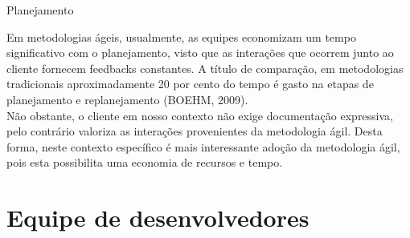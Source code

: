 \large{Planejamento\\}

\tab Em metodologias ágeis, usualmente, as equipes economizam um tempo significativo com o planejamento, visto que as interações que ocorrem junto ao cliente fornecem feedbacks constantes. A título de comparação, em metodologias tradicionais aproximadamente 20 por cento do tempo é gasto na etapas de planejamento e replanejamento (BOEHM, 2009). \\
\tab Não obstante, o cliente em nosso contexto não exige documentação expressiva, pelo contrário valoriza as interações provenientes da metodologia ágil. Desta forma, neste contexto  específico é mais interessante adoção da metodologia ágil,  pois esta  possibilita uma economia de recursos e tempo. \\


	\large{\section {Equipe de desenvolvedores\\}}


